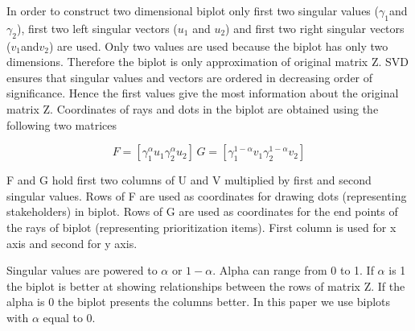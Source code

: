 In order to construct two dimensional biplot only first two singular
values ($\gamma_{1}$and$\gamma_{2}$), first two left singular vectors
($u_{1}$ and $u_{2}$) and first two right singular vectors ($v_{1}$and$v_{2}$)
are used. Only two values are used because the biplot has only two
dimensions. Therefore the biplot is only approximation of original
matrix Z. SVD ensures that singular values and vectors are ordered
in decreasing order of significance. Hence the first values give
the most information about the original matrix Z. Coordinates of rays
and dots in the biplot are obtained using the following two matrices

\begin{equation}
F=\left[\gamma_{1}^{\alpha}u_{1}\gamma_{2}^{\alpha}u_{2}\right]\, G=\left[\gamma_{1}^{1-\alpha}v_{1}\gamma_{2}^{1-\alpha}v_{2}\right]
\end{equation}

F and G hold first two columns of U and V multiplied by first and
second singular values. Rows of F are used as coordinates for drawing
dots (representing stakeholders) in biplot. Rows of G are used as
coordinates for the end points of the rays of biplot (representing
prioritization items). First column is used for x axis and second
for y axis.

Singular values are powered to $\alpha$ or $1-\alpha$. Alpha can
range from 0 to 1. If $\alpha$ is 1 the biplot is better at showing
relationships between the rows of matrix Z. If the alpha is 0 the
biplot presents the columns better. In this paper we use biplots with
$\alpha$ equal to 0.
